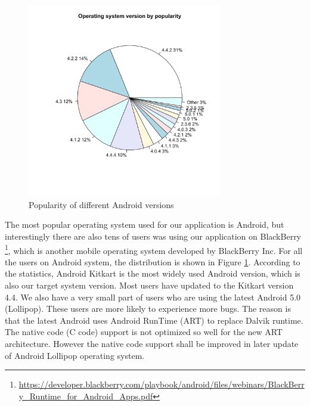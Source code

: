 \begin{figure}[!t]
\centering \includegraphics[height=8.5cm]{charts/os_version_popularity}
\caption{Popularity of different Android versions \label{os_versions}}
\end{figure}
The most popular operating system used for our application is Android, but
interestingly there are also tens of users was using our application on BlackBerry \footnote{\url{https://developer.blackberry.com/playbook/android/files/webinars/BlackBerry_Runtime_for_Android_Apps.pdf}}, which is another mobile operating system developed by BlackBerry Inc.  For all the users on Android system, the distribution is shown in Figure \ref{os_versions}. According to the statistics, Android Kitkart is the most widely used Android version, which is also our target system version. Most users have updated to the Kitkart version 4.4. We also have a very small part of users who are using the latest Android 5.0 (Lollipop). These users are more likely to experience more bugs. The reason is that the latest Android uses Android RunTime (ART) to replace Dalvik runtime\cite{dalvik_arch}. The native code (C code) support is not optimized so well for the new ART architecture. However the native code support shall be improved in later update of Android Lollipop operating system.

